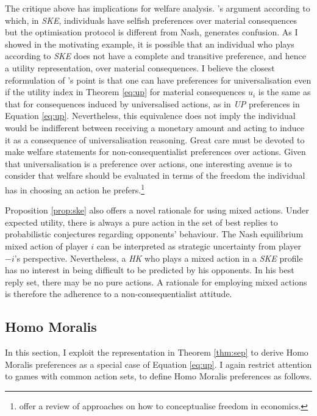 The critique above has implications for welfare analysis. \citeauthor{roemer2019we}'s argument according to which, in \textit{SKE}, individuals have selfish preferences over material consequences but the optimisation protocol is different from Nash, generates confusion. As I showed in the motivating example, it is possible that an individual who plays according to \textit{SKE} does not have a complete and transitive preference, and hence a utility representation, over material consequences. I believe the closest reformulation of \citeauthor{roemer2019we}'s point is that one can have preferences for universalisation even if the utility index in Theorem \ref{eq:up} for material consequences \( u_i \) is the same as that for consequences induced by universalised actions, as in \textit{UP} preferences in Equation \eqref{eq:up}. Nevertheless, this equivalence does not imply the individual would be indifferent between receiving a monetary amount and acting to induce it as a consequence of universalisation reasoning. Great care must be devoted to make welfare statements for non-consequentialist preferences over actions. Given that universalisation is a preference over actions, one interesting avenue is to consider that welfare should be evaluated in terms of the freedom the individual has in choosing an action he prefers.\footnote{\cite{laslierFreedomEconomics1998} offer a review of approaches on how to conceptualise freedom in economics.}

Proposition \ref{prop:ske} also offers a novel rationale for using mixed actions. Under expected utility, there is always a pure action in the set of best replies to probabilistic conjectures regarding opponents' behaviour. The Nash equilibrium mixed action of player \( i \) can be interpreted as strategic uncertainty from player \( -i \)'s perspective. Nevertheless, a \textit{HK} who plays a mixed action in a \textit{SKE} profile has no interest in being difficult to be predicted by his opponents. In his best reply set, there may be no pure actions. A rationale for employing mixed actions is therefore the adherence to a non-consequentialist attitude.

\subsection{Homo Moralis}\label{subsec:hm}

In this section, I exploit the representation in Theorem \ref{thm:sep} to derive Homo Moralis preferences as a special case of Equation \eqref{eq:up}. I again restrict attention to games with common action sets, to define Homo Moralis preferences as follows.

